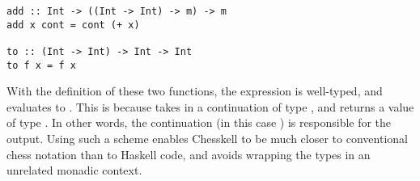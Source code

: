 \begin{lstlisting}
add :: Int -> ((Int -> Int) -> m) -> m
add x cont = cont (+ x)

to :: (Int -> Int) -> Int -> Int
to f x = f x
\end{lstlisting}

With the definition of these two functions, the expression  is well-typed, and evaluates to . This is because  takes in a continuation of type , and returns a value of type . In other words, the continuation (in this case ) is responsible for the output. Using such a scheme enables Chesskell to be much closer to conventional chess notation than to Haskell code, and avoids wrapping the types in an unrelated monadic context.
